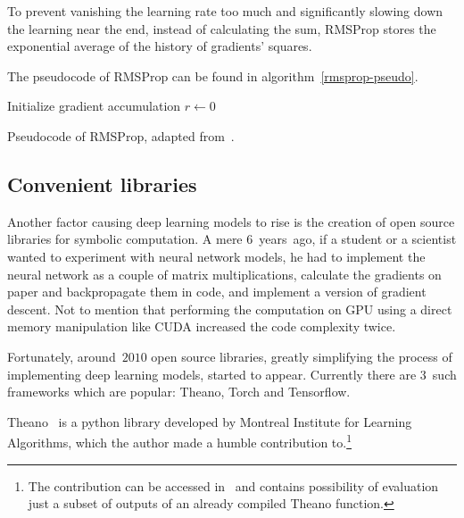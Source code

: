 To prevent vanishing the learning rate too much and significantly slowing down the learning near the end, instead of calculating the sum, RMSProp stores the exponential average of the history of gradients' squares.

The pseudocode of RMSProp can be found in algorithm~\ref{rmsprop-pseudo}.
\begin{algorithm}
  \DontPrintSemicolon
  Initialize gradient accumulation $r \leftarrow 0$\;
  \caption{Pseudocode of RMSProp, adapted from~\cite[Chapter 8.5.2]{dlbook}.}\label{rmsprop-pseudo}
\end{algorithm}

\subsection{Convenient libraries}
Another factor causing deep learning models to rise is the creation of open source libraries for symbolic computation. A mere $6$~years~ago, if a student or a scientist wanted to experiment with neural network models, he had to implement the neural network as a couple of matrix multiplications, calculate the gradients on paper and backpropagate them in code, and implement a version of gradient descent. Not to mention that performing the computation on GPU using a direct memory manipulation like CUDA increased the code complexity twice.

Fortunately, around~$2010$ open source libraries, greatly simplifying the process of implementing deep learning models, started to appear. Currently there are $3$~such frameworks which are popular: Theano, Torch and Tensorflow.

Theano~\cite{theano} is a python library developed by Montreal Institute for Learning Algorithms, which the author made a humble contribution to.\footnote{The contribution can be accessed in~\cite{theano-contrib} and contains possibility of evaluation just a subset of outputs of an already compiled Theano function.}

